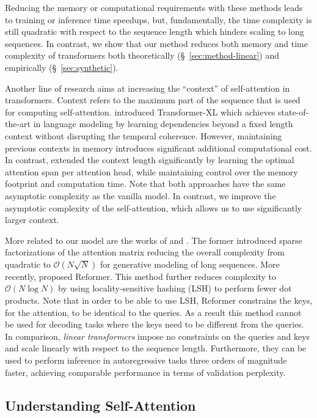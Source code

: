 Reducing the memory or computational requirements with these methods leads to training or inference time speedups, but, fundamentally, the time complexity is still quadratic with respect to the sequence length which hinders scaling to long sequences. In contrast, we show that our method reduces both memory and time complexity of transformers both theoretically
(\S~\ref{sec:method-linear}) and empirically (\S~\ref{sec:synthetic}).

Another line of research aims at increasing the ``context'' of self-attention in transformers. Context refers to the maximum part of the sequence that is used for computing self-attention. \citet{dai-etal-2019-transformer} introduced Transformer-XL which achieves state-of-the-art in language modeling by learning dependencies beyond a fixed length context without disrupting the temporal coherence. However, maintaining previous contexts in memory introduces significant additional computational cost. In contrast,
\citet{sukhbaatar-etal-2019} extended the context length significantly by learning the optimal attention span per attention head, while maintaining control over the memory footprint and computation time. Note that both approaches have the same asymptotic complexity as the vanilla model. In contrast, we improve the asymptotic complexity of the self-attention, which allows us to use significantly larger context.

More related to our model are the works of \citet{child2019generating} and
\citet{kitaev2020reformer}. The former \cite{child2019generating} introduced sparse factorizations of the attention matrix reducing the overall complexity from quadratic to $\mathcal{O}\left(N\sqrt{N}\right)$ for generative modeling of long sequences. More recently, \citet{kitaev2020reformer} proposed Reformer. This method further reduces complexity to $\mathcal{O}\left(N \log{N}\right)$ by using locality-sensitive hashing (LSH) to perform fewer dot products. Note that in order to be able to use LSH, Reformer constrains the keys, for the attention, to be identical to the queries. As a result this method cannot be used for decoding tasks where the keys need to be different from the queries. In comparison, \emph{linear transformers} impose no constraints on the queries and keys and scale linearly with respect to the sequence length. Furthermore, they can be used to perform inference in autoregressive tasks three orders of magnitude faster, achieving comparable performance in terms of validation perplexity.

\subsection{Understanding Self-Attention}

